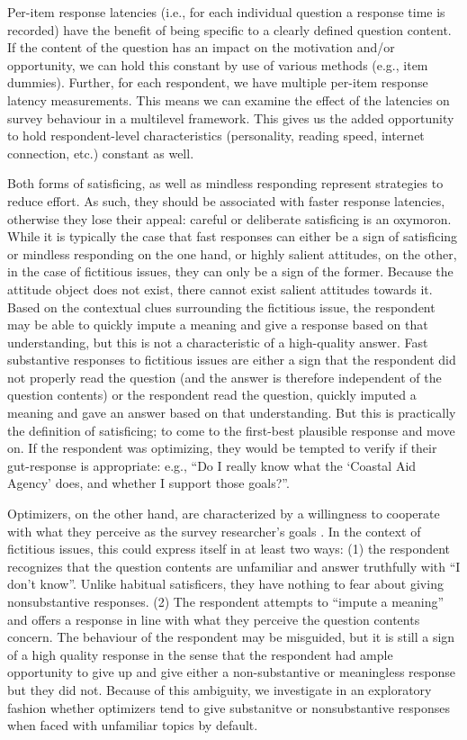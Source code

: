 \documentclass[Royal,times,sageh]{sagej}
\begin{document}
Per-item response latencies (i.e., for each individual question a
response time is recorded) have the benefit of being specific to a
clearly defined question content. If the content of the question has an
impact on the motivation and/or opportunity, we can hold this constant
by use of various methods (e.g., item dummies). Further, for each
respondent, we have multiple per-item response latency measurements.
This means we can examine the effect of the latencies on survey
behaviour in a multilevel framework. This gives us the added opportunity
to hold respondent-level characteristics (personality, reading speed,
internet connection, etc.) constant as well.

Both forms of satisficing, as well as mindless responding represent
strategies to reduce effort. As such, they should be associated with
faster response latencies, otherwise they lose their appeal: careful or
deliberate satisficing is an oxymoron. While it is typically the case
that fast responses can either be a sign of satisficing or mindless
responding on the one hand, or highly salient attitudes, on the other,
in the case of fictitious issues, they can only be a sign of the former.
Because the attitude object does not exist, there cannot exist salient
attitudes towards it. Based on the contextual clues surrounding the
fictitious issue, the respondent may be able to quickly impute a meaning
and give a response based on that understanding, but this is not a
characteristic of a high-quality answer. Fast substantive responses to
fictitious issues are either a sign that the respondent did not properly
read the question (and the answer is therefore independent of the
question contents) or the respondent read the question, quickly imputed
a meaning and gave an answer based on that understanding. But this is
practically the definition of satisficing; to come to the first-best
plausible response and move on. If the respondent was optimizing, they
would be tempted to verify if their gut-response is appropriate: e.g.,
``Do I really know what the `Coastal Aid Agency' does, and whether I
support those goals?''.

Optimizers, on the other hand, are characterized by a willingness to
cooperate with what they perceive as the survey researcher's goals
\citep{Stocke2004a}. In the context of fictitious issues, this could
express itself in at least two ways: (1) the respondent recognizes that
the question contents are unfamiliar and answer truthfully with ``I
don't know''. Unlike habitual satisficers, they have nothing to fear
about giving nonsubstantive responses. (2) The respondent attempts to
``impute a meaning'' and offers a response in line with what they
perceive the question contents concern. The behaviour of the respondent
may be misguided, but it is still a sign of a high quality response in
the sense that the respondent had ample opportunity to give up and give
either a non-substantive or meaningless response but they did not.
Because of this ambiguity, we investigate in an exploratory fashion
whether optimizers tend to give substanitve or nonsubstantive responses
when faced with unfamiliar topics by default.
\end{document}
